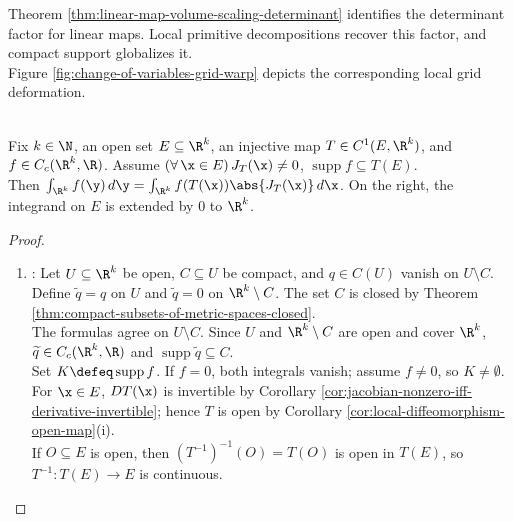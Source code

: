 Theorem \ref{thm:linear-map-volume-scaling-determinant} identifies the determinant factor for linear maps. Local primitive decompositions recover this factor, and compact support globalizes it.\\
Figure \ref{fig:change-of-variables-grid-warp} depicts the corresponding local grid deformation.

\begin{illustrationfigure}[H]
  \centering
  
  \caption{A $C^1$ change of variables warps a grid; $\abs{J_T}$ records local volume scaling.}
  \label{fig:change-of-variables-grid-warp}
\end{illustrationfigure}

\begin{theorem} \label{thm:change-of-variables-rk} \\
Fix $k\in\N$, an open set $E\subseteq\R^k$, an injective map $T\in C^1(E,\R^k)$, and $f\in C_c(\R^k,\R)$. Assume $(\forall\,\x\in E)\,J_T(\x)\neq0$, $\operatorname{supp}f\subseteq T(E)$.\\
Then $\int_{\R^k}f(\y)\,d\y=\int_{\R^k}f(T(\x))\abs{J_T(\x)}\,d\x$. On the right, the integrand on $E$ is extended by $0$ to $\R^k$.
\begin{proof}
\begin{enumerate}[label=(\roman*)]
\setlength{\itemsep}{0pt}
\item {}: Let $U\subseteq\R^k$ be open, $C\subseteq U$ be compact, and $q\in C(U)$ vanish on $U\setminus C$.\\
Define $\widetilde q=q$ on $U$ and $\widetilde q=0$ on $\R^k\setminus C$. The set $C$ is closed by Theorem \ref{thm:compact-subsets-of-metric-spaces-closed}.\\
The formulas agree on $U\setminus C$. Since $U$ and $\R^k\setminus C$ are open and cover $\R^k$, $\widetilde q\in C_c(\R^k,\R)$ and $\operatorname{supp}\widetilde q\subseteq C$.\\
Set $K\defeq\operatorname{supp}f$. If $f=0$, both integrals vanish; assume $f\neq0$, so $K\neq\emptyset$.\\
For $\x\in E$, $DT(\x)$ is invertible by Corollary \ref{cor:jacobian-nonzero-iff-derivative-invertible}; hence $T$ is open by Corollary \ref{cor:local-diffeomorphism-open-map}(i).\\
If $O\subseteq E$ is open, then $(T^{-1})^{-1}(O)=T(O)$ is open in $T(E)$, so $T^{-1}:T(E)\to E$ is continuous.\\

\end{enumerate}
\end{proof}
\end{theorem}
